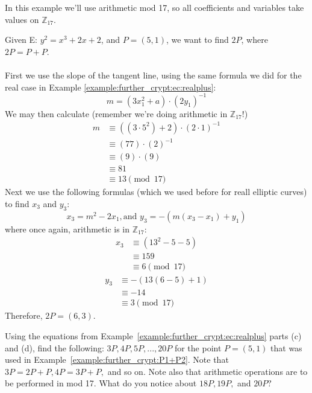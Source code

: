 \begin{example}\label{example:further_crypt:P1+P2} In this example we'll use arithmetic mod 17, so  all coefficients and variables take values on $\mathbb{Z}_{17}$.  

Given E: $y^2 = x^3 + 2x + 2$, and $P = (5,1)$,  we want to find $2P$, where $2P = P + P$.\\ \\
First we use the slope of the tangent line, using the same formula we did for the real case in Example \ref{example:further_crypt:ec:realplus}:	
\[m = (3x_1^2 + a) \cdot (2y_1)^{-1}\]	
We may then calculate (remember we're doing arithmetic in  $\mathbb{Z}_{17}$!)
\begin{align*}
		m &\equiv ( (3 \cdot 5^2) + 2) \cdot (2 \cdot 1)^{-1} \\
	          &\equiv  (77) \cdot (2)^{-1} \\
                     &\equiv (9) \cdot (9)\\
                     &\equiv 81 \\
                    &\equiv 13 \pmod{17}
		\end{align*}
Next we use the following formulas (which we used before for reall elliptic curves) to find $x_3$ and $y_3$: \[ x_3 = m^2 - 2x_1  , \text{and~} y_3 =-(  m(x_3 - x_1)+y_1)\]
where once again, arithmetic is in $\mathbb{Z}_{17}$:
\begin{align*}
		x_3 &\equiv  (13^2 - 5 - 5 ) \\
	          &\equiv 159\\
                     &\equiv 6 \pmod{17}
		\end{align*}
			\begin{align*}
		y_3 &\equiv - (13(6 - 5) +1) \\
	          &\equiv -14\\
                     &\equiv 3 \pmod{17}
		\end{align*}
Therefore, $2P = (6,3)$.
\end{example}

\begin{exercise}\label{exercise:further_crypt:P}
Using the equations from Example~\ref{example:further_crypt:ec:realplus} parts (c) and (d), find the following: $3P, 4P, 5P, ..., 20P$ for the point $P=(5,1)$ that was used in Example~\ref{example:further_crypt:P1+P2}.  Note that $3P = 2P + P,  4P = 3P +P,$ and so on. Note also that arithmetic operations are to be performed in mod 17.  What do you notice about $18P,  19P,$ and $20P?$
\end{exercise}

